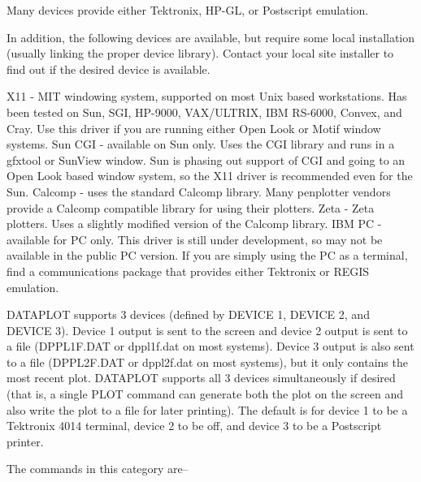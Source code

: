 Many devices provide either Tektronix, HP-GL, or Postscript emulation.
 
In addition, the following devices are available, but require some
local installation (usually linking the proper device library).
Contact your local site installer to find out if the desired device is
available.
 
    X11           - MIT windowing system, supported on most Unix based
                    workstations.  Has been tested on Sun, SGI,
                    HP-9000, VAX/ULTRIX, IBM RS-6000, Convex, and Cray.
                    Use this driver if you are running either Open Look
                    or Motif window systems.
    Sun CGI       - available on Sun only.  Uses the CGI library and
                    runs in a gfxtool or SunView window.  Sun is
                    phasing out support of CGI and going to an Open
                    Look based window system, so the X11 driver is
                    recommended even for the Sun.
    Calcomp       - uses the standard Calcomp library.  Many penplotter
                    vendors provide a Calcomp compatible library for
                    using their plotters.
    Zeta          - Zeta plotters.  Uses a slightly modified version of
                    the Calcomp library.
    IBM PC        - available for PC only.  This driver is still under
                    development, so may not be available in the public
                    PC version.  If you are simply using the PC as a
                    terminal, find a communications package that
                    provides either Tektronix or REGIS emulation.
 
DATAPLOT supports 3 devices (defined by DEVICE 1, DEVICE 2, and
DEVICE 3).  Device 1 output is sent to the screen and device 2 output
is sent to a file (DPPL1F.DAT or dppl1f.dat on most systems).  Device 3
output is also sent to a file (DPPL2F.DAT or dppl2f.dat on most
systems), but it only contains the most recent plot.  DATAPLOT supports
all 3 devices simultaneously if desired (that is, a single PLOT command
can generate both the plot on the screen and also write the plot to a
file for later printing).  The default is for device 1 to be a
Tektronix 4014 terminal, device 2 to be off, and device 3 to be a
Postscript printer.
 
The commands in this category are--
 
